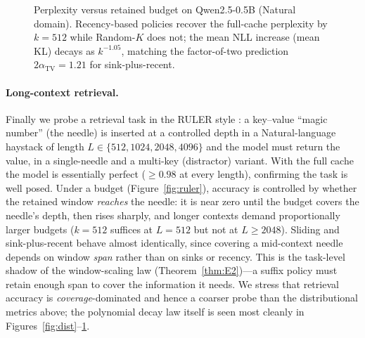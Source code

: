 \documentclass[11pt]{article}
\newcommand{\TV}{\mathrm{TV}}
\theoremstyle{plain}
\theoremstyle{definition}
\theoremstyle{remark}
\begin{document}
\begin{figure}[t]
\centering
{}
\caption{Perplexity versus retained budget on Qwen2.5-0.5B (Natural
domain). Recency-based policies recover the full-cache perplexity by
$k=512$ while Random-$K$ does not; the mean NLL increase (mean KL)
decays as $k^{-1.05}$, matching the factor-of-two prediction
$2\alpha_{\TV}=1.21$ for sink-plus-recent.}
\label{fig:tradeoff}
\end{figure}

\paragraph{Long-context retrieval.}
Finally we probe a retrieval task in the RULER style
\citep{hsieh2024ruler}: a key--value ``magic number'' (the needle) is
inserted at a controlled depth in a Natural-language haystack of length
$L \in \{512, 1024, 2048, 4096\}$ and the model must return the value,
in a single-needle and a multi-key (distractor) variant. With the full
cache the model is essentially perfect ($\ge 0.98$ at every length),
confirming the task is well posed. Under a budget
(Figure~\ref{fig:ruler}), accuracy is controlled by whether the retained
window \emph{reaches} the needle: it is near zero until the budget
covers the needle's depth, then rises sharply, and longer contexts
demand proportionally larger budgets ($k = 512$ suffices at $L = 512$
but not at $L \ge 2048$). Sliding and sink-plus-recent behave almost
identically, since covering a mid-context needle depends on window
\emph{span} rather than on sinks or recency. This is the task-level
shadow of the window-scaling law (Theorem~\ref{thm:E2})---a suffix
policy must retain enough span to cover the information it needs. We
stress that retrieval accuracy is \emph{coverage}-dominated and hence a
coarser probe than the distributional metrics above; the polynomial
decay law itself is seen most cleanly in
Figures~\ref{fig:dist}--\ref{fig:tradeoff}.
\end{document}
